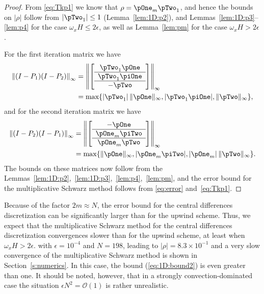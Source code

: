 \begin{proof}
From \eqref{eq:Tkp1} we know that $\rho=\pOne_m \pTwo_1$, and hence the bounds
on $|\rho|$ follow from $|\pTwo_1|\leq 1$ (Lemma~\ref{lem:1D:p2}), and
Lemmas~\ref{lem:1D:p3}--\ref{lem:p4} for the case $\omega_x H\leq 2\epsilon$, as
well as Lemma~\ref{lem:pm} for the case $\omega_x H > 2\epsilon$.

For the first iteration matrix we have
%
\begin{align*}
\left\Vert(I-P_{1})(I-P_{2})\right\Vert_\infty &=
\left\Vert\left[\begin{array}{c}
\pTwo_{1}\pOne\\
\hline \pTwo_{1}\piOne\\
\hline -\pTwo
\end{array}\right]\right\Vert_\infty\\
&=\max\{|\pTwo_{1}|\,\|\pOne\|_\infty, |\pTwo_{1}\piOne|, \|\pTwo\|_\infty\},
\end{align*}
%
and for the second iteration matrix we have
%
\begin{align*}
 \left\Vert(I-P_{2})(I-P_{1})\right\Vert_\infty &= \left\Vert\left[\begin{array}{c}
-\pOne\\
\hline \pOne_{m}\piTwo\\
\hline \pOne_{m}\pTwo
\end{array}\right]\right\Vert_\infty \\
&= \max\{\|\pOne\|_\infty, |\pOne_{m}\piTwo|, |\pOne_{m}|\,\|\pTwo\|_\infty\}.
\end{align*}
%
The bounds on these matrices now follow from the
Lemmas~\ref{lem:1D:p2},~\ref{lem:1D:p3},~\ref{lem:p4},~\ref{lem:pm},
and the error bound for the multiplicative Schwarz method follows from
\eqref{eq:error} and~\eqref{eq:Tkp1}.
%
\end{proof}


Because of the factor $2m\approx N$, the error bound for the central
differences discretization can be significantly larger than for the upwind
scheme. Thus, we expect that the multiplicative Schwarz method for the central
differences discretization convergences slower than for the upwind scheme, at
least when $\omega_x H>2\epsilon$.  with $\epsilon=10^{-4}$ and
$N=198$, leading to $|\rho|=8.3\times 10^{-1}$ and a very slow convergence of
the multiplicative Schwarz method is shown in Section~\ref{s:numerics}.
In this case, the bound (\ref{eq:1D:bound2}) is even greater than one.  It should
be noted, however, that in a strongly convection-dominated case the situation
$\epsilon N^2=\mathscr{O}(1)$ is rather unrealistic.

